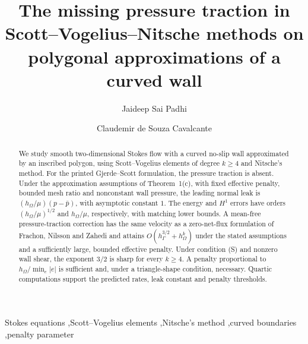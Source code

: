 \documentclass[5p,times]{elsarticle}
\theoremstyle{definition}
\begin{document}
\begin{frontmatter}
\title{The missing pressure traction in Scott--Vogelius--Nitsche methods on polygonal approximations of a curved wall}

\author[pur]{Jaideep Sai Padhi}
\address[pur]{Department of Computer Science, Purdue University, West Lafayette, IN 47907, USA}
\author[cav]{Claudemir de Souza Cavalcante}
\address[cav]{Graduate Program in Mathematics and Statistics, Institute of Exact and Natural Sciences, Federal University of Par\'a (UFPA), Bel\'em, Brazil}

\begin{abstract}
We study smooth two-dimensional Stokes flow with a curved no-slip wall approximated by an inscribed polygon, using Scott--Vogelius elements of degree $k\ge4$ and Nitsche's method. For the printed Gjerde--Scott formulation, the pressure traction is absent. Under the approximation assumptions of Theorem~1(c), with fixed effective penalty, bounded mesh ratio and nonconstant wall pressure, the leading normal leak is $(h_\Omega/\mu)(p-\bar p)$, with asymptotic constant $1$. The energy and $H^1$ errors have orders $(h_\Omega/\mu)^{1/2}$ and $h_\Omega/\mu$, respectively, with matching lower bounds. A mean-free pressure-traction correction has the same velocity as a zero-net-flux formulation of Frachon, Nilsson and Zahedi and attains $O(h_\Gamma^{3/2}+h_\Omega^k)$ under the stated assumptions and a sufficiently large, bounded effective penalty. Under condition (S) and nonzero wall shear, the exponent $3/2$ is sharp for every $k\ge4$. A penalty proportional to $h_\Omega/\min_e|e|$ is sufficient and, under a triangle-shape condition, necessary. Quartic computations support the predicted rates, leak constant and penalty thresholds.
\end{abstract}

\begin{keyword}
Stokes equations \sep Scott--Vogelius elements \sep Nitsche's method \sep curved boundaries \sep penalty parameter
\end{keyword}
\end{frontmatter}

\end{document}
